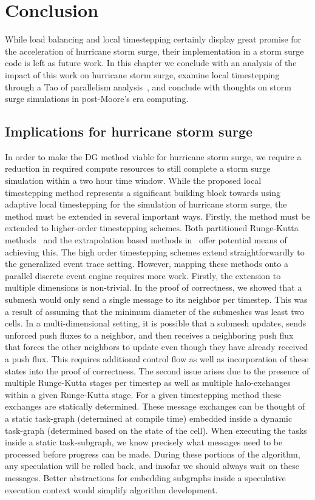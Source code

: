 \chapter{Conclusion}

While load balancing and local timestepping certainly display great promise for the acceleration of hurricane storm surge, their implementation in a storm surge code is left as future work. In this chapter we conclude with an analysis of the impact of this work on hurricane storm surge, examine local timestepping through a Tao of parallelism analysis~\cite{Pingali2011}, and conclude with thoughts on storm surge simulations in post-Moore's era computing.

\section{Implications for hurricane storm surge}
In order to make the DG method viable for hurricane storm surge, we require a reduction in required compute resources to still complete a storm surge simulation within a two hour time window. While the proposed local timestepping method represents a significant building block towards using adaptive local timestepping for the simulation of hurricane storm surge, the method must be extended in several important ways. Firstly, the method must be extended to higher-order timestepping schemes. Both partitioned Runge-Kutta methods~\cite{Constantinescu2007} and the extrapolation based methods in~\cite{Hoang2019} offer potential means of achieving this. The high order timestepping schemes extend straightforwardly to the  generalized event trace setting. However, mapping these methods onto a parallel discrete event engine requires more work. Firstly, the extension to multiple dimensions is non-trivial. In the proof of correctness, we showed that a submesh would only send a single message to its neighbor per timestep. This was a result of assuming that the minimum diameter of the submeshes was least two cells. In a multi-dimensional setting, it is possible that a submesh updates, sends unforced push fluxes to a neighbor, and then receives a neighboring push flux that forces the other neighbors to update even though they have already received a push flux. This requires additional control flow as well as incorporation of these states into the proof of correctness.
The second issue arises due to the presence of multiple Runge-Kutta stages per timestep as well as multiple halo-exchanges within a given Runge-Kutta stage. For a given timestepping method these exchanges are statically determined. These message exchanges can be thought of a static task-graph (determined at compile time) embedded inside a dynamic task-graph (determined based on the state of the cell). When executing the tasks inside a static task-subgraph, we know precisely what messages need to be processed before progress can be made. During these portions of the algorithm, any speculation will be rolled back, and insofar we should always wait on these messages. Better abstractions for embedding subgraphs inside a speculative execution context would simplify algorithm development.

